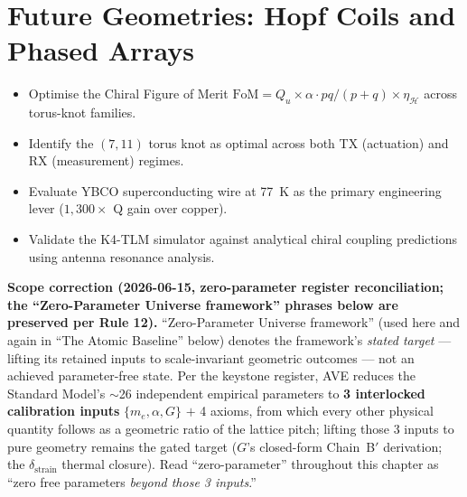 \chapter{Future Geometries: Hopf Coils and Phased Arrays}
\label{ch:future_geometries}


\begin{objectivebox}
\begin{itemize}
    \item Optimise the Chiral Figure of Merit $\text{FoM} = Q_u \times \alpha \cdot pq/(p+q) \times \eta_{\mathcal{H}}$ across torus-knot families.
    \item Identify the $(7,11)$ torus knot as optimal across both TX (actuation) and RX (measurement) regimes.
    \item Evaluate YBCO superconducting wire at 77~K as the primary engineering lever ($1{,}300\times$ Q gain over copper).
    \item Validate the K4-TLM simulator against analytical chiral coupling predictions using antenna resonance analysis.
\end{itemize}
\end{objectivebox}

\noindent\textbf{Scope correction (2026-06-15, zero-parameter register reconciliation; the ``Zero-Parameter Universe framework'' phrases below are preserved per Rule 12).} ``Zero-Parameter Universe framework'' (used here and again in ``The Atomic Baseline'' below) denotes the framework's \emph{stated target} --- lifting its retained inputs to scale-invariant geometric outcomes --- not an achieved parameter-free state. Per the keystone register, AVE reduces the Standard Model's $\sim$26 independent empirical parameters to \textbf{3 interlocked calibration inputs} $\{m_e, \alpha, G\}$ $+$ 4 axioms, from which every other physical quantity follows as a geometric ratio of the lattice pitch; lifting those 3 inputs to pure geometry remains the gated target ($G$'s closed-form Chain~B$'$ derivation; the $\delta_{\text{strain}}$ thermal closure). Read ``zero-parameter'' throughout this chapter as ``zero free parameters \emph{beyond those 3 inputs}.''


